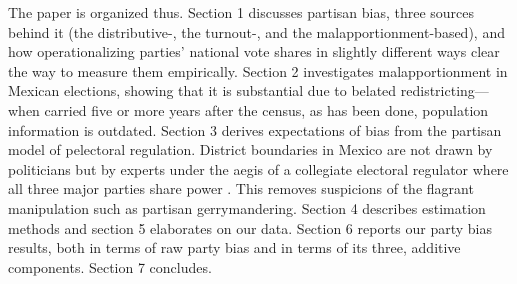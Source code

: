 \documentclass[letter,12pt]{article}
\begin{document}
The paper is organized thus. Section 1 discusses partisan bias, three sources behind it (the distributive-, the turnout-, and the malapportionment-based), and how operationalizing parties' national vote shares in slightly different ways clear the way to measure them empirically. Section 2 investigates malapportionment in Mexican elections, showing that it is substantial due to belated redistricting---when carried five or more years after the census, as has been done, population information is outdated. Section 3 derives expectations of bias from the partisan model of pelectoral regulation. District boundaries in Mexico are not drawn by politicians but by experts under the aegis of a collegiate electoral regulator where all three major parties share power \citep{estevez.magar.rosas.2008}. This removes suspicions of the flagrant manipulation such as partisan gerrymandering. Section 4 describes estimation methods and section 5 elaborates on our data. Section 6 reports our party bias results, both in terms of raw party bias and in terms of its three, additive components. Section 7 concludes. 



\end{document}
